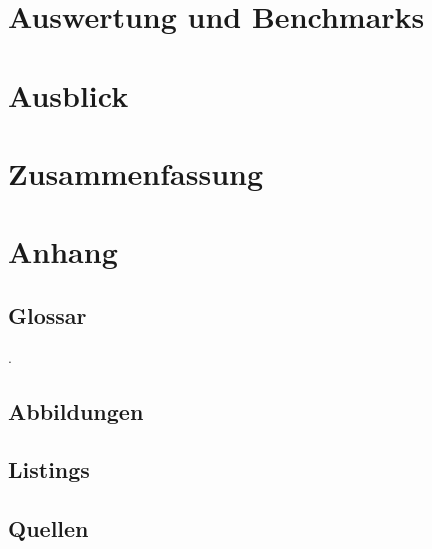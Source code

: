 \documentclass[12pt]{article}
\begin{document}
\newpage %

\section{Auswertung und Benchmarks}
\label{sec:auswertung}


\newpage %

\section{Ausblick}
\label{sec:ausblick}


\newpage %

\section{Zusammenfassung}
\label{sec:zusammenfassung}


\newpage %

\cfoot{}
\section{Anhang}
\label{sec:anhang}

\subsection{Glossar}
\label{subsec:glossar}
\begingroup
\renewcommand{\section}[2]{}
\printglossary[style=tree]
\endgroup
\newpage

{\small\color{white}.}
\vspace{-2cm}
\subsection{Abbildungen}
\label{subsec:abbildungen}
\begingroup
\renewcommand{\section}[2]{}
\listoffigures
\endgroup

\subsection{Listings}
\label{subsec:listings}
\begingroup
\renewcommand{\section}[2]{}
\lstlistoflistings
\endgroup

\subsection{Quellen}
\label{subsec:quellen}
\begingroup
\renewcommand{\section}[2]{}


\endgroup
\end{document}
